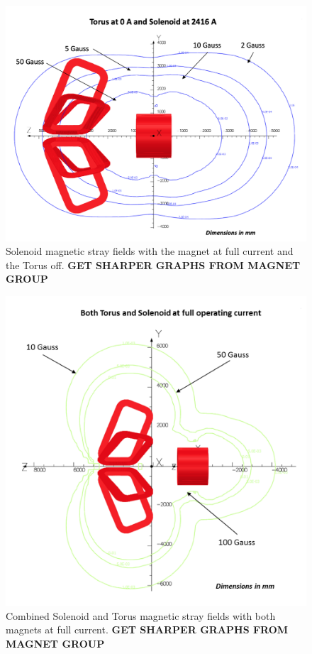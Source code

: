 \documentclass[final,3p,twocolumn]{elsarticle}
\begin{document}
\begin{figure}[htbp!]
\centerline{\includegraphics[width=1.0\columnwidth]{mag-field-1.png}}
\caption{Solenoid magnetic stray fields with the magnet at full current and the Torus off. {\bf GET SHARPER GRAPHS
FROM MAGNET GROUP}}
\label{stray-field1}
\end{figure}

\begin{figure}[htbp!]
\centerline{\includegraphics[width=1.2\columnwidth]{mag-field-2.png}}
\caption{Combined Solenoid and Torus magnetic stray fields with both magnets at full current.  {\bf GET SHARPER
GRAPHS FROM MAGNET GROUP}}
\label{stray-field2}
\end{figure}
\end{document}
